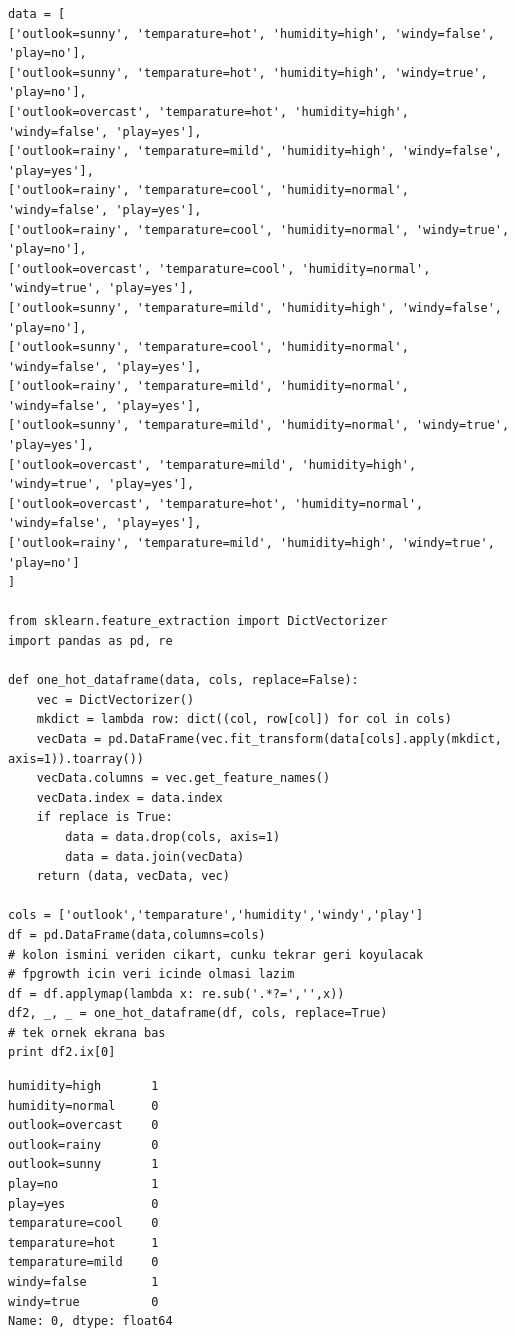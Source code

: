 \documentclass[12pt,fleqn]{article}\usepackage{../common}
\begin{document}
\begin{verbatim}
data = [
['outlook=sunny', 'temparature=hot', 'humidity=high', 'windy=false', 'play=no'],
['outlook=sunny', 'temparature=hot', 'humidity=high', 'windy=true', 'play=no'],
['outlook=overcast', 'temparature=hot', 'humidity=high', 'windy=false', 'play=yes'],
['outlook=rainy', 'temparature=mild', 'humidity=high', 'windy=false', 'play=yes'],
['outlook=rainy', 'temparature=cool', 'humidity=normal', 'windy=false', 'play=yes'],
['outlook=rainy', 'temparature=cool', 'humidity=normal', 'windy=true', 'play=no'],
['outlook=overcast', 'temparature=cool', 'humidity=normal', 'windy=true', 'play=yes'],
['outlook=sunny', 'temparature=mild', 'humidity=high', 'windy=false', 'play=no'],
['outlook=sunny', 'temparature=cool', 'humidity=normal', 'windy=false', 'play=yes'],
['outlook=rainy', 'temparature=mild', 'humidity=normal', 'windy=false', 'play=yes'],
['outlook=sunny', 'temparature=mild', 'humidity=normal', 'windy=true', 'play=yes'],
['outlook=overcast', 'temparature=mild', 'humidity=high', 'windy=true', 'play=yes'],
['outlook=overcast', 'temparature=hot', 'humidity=normal', 'windy=false', 'play=yes'],
['outlook=rainy', 'temparature=mild', 'humidity=high', 'windy=true', 'play=no']
]

from sklearn.feature_extraction import DictVectorizer
import pandas as pd, re

def one_hot_dataframe(data, cols, replace=False):
    vec = DictVectorizer()
    mkdict = lambda row: dict((col, row[col]) for col in cols)
    vecData = pd.DataFrame(vec.fit_transform(data[cols].apply(mkdict, axis=1)).toarray())
    vecData.columns = vec.get_feature_names()
    vecData.index = data.index
    if replace is True:
        data = data.drop(cols, axis=1)
        data = data.join(vecData)
    return (data, vecData, vec)

cols = ['outlook','temparature','humidity','windy','play']
df = pd.DataFrame(data,columns=cols)
# kolon ismini veriden cikart, cunku tekrar geri koyulacak
# fpgrowth icin veri icinde olmasi lazim
df = df.applymap(lambda x: re.sub('.*?=','',x))
df2, _, _ = one_hot_dataframe(df, cols, replace=True)
# tek ornek ekrana bas
print df2.ix[0]
\end{verbatim}

\begin{verbatim}
humidity=high       1
humidity=normal     0
outlook=overcast    0
outlook=rainy       0
outlook=sunny       1
play=no             1
play=yes            0
temparature=cool    0
temparature=hot     1
temparature=mild    0
windy=false         1
windy=true          0
Name: 0, dtype: float64
\end{verbatim}
\end{document}
